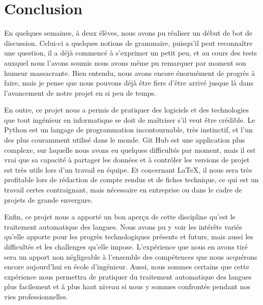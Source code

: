 \documentclass[paper=a4, fontsize=12pt]{article}
\begin{document}
\section{Conclusion}
En quelques semaines, à deux élèves, nous avons pu réaliser un début de bot de discussion. Celui-ci a quelques notions de grammaire, puisqu'il peut reconnaître une question, il a déjà commencé à s'exprimer un petit peu, et au cours des tests auxquel nous l'avons soumis nous avons même pu remarquer par moment son humeur massacrante. Bien entendu, nous avons encore énormément de progrès à faire, mais je pense que nous pouvons déjà être fiers d'être arrivé jusque là dans l'avancement de notre projet en si peu de temps. 

En outre, ce projet nous a permis de pratiquer des logiciels et des technologies que tout ingénieur en informatique se doit de maîtriser s'il veut être crédible. Le Python est un langage de programmation incontournable, très instinctif, et l'un des plus couramment utilisé dans le monde. Git Hub est une application plus complexe, sur laquelle nous avons eu quelques difficultés par moment, mais il est vrai que sa capacité à partager les données et à contrôler les versions de projet est très utile lors d'un travail en équipe. Et concernant LaTeX, il nous sera très profitable lors de rédaction de compte rendus et de fiches technique, ce qui est un travail certes contraignant, mais nécessaire en entreprise ou dans le cadre de projets de grande envergure.

Enfin, ce projet nous a apporté un bon aperçu de cette discipline qu'est le traitement automatique des langues. Nous avons pu y voir les intérêts variés qu'elle apporte pour les progrès technologiques présents et futurs, mais aussi les difficultés et les challenges qu'elle impose. L'expérience que nous en avons tiré sera un apport non négligeable à l'ensemble des compétences que nous acquérons encore aujourd'hui en école d'ingénieur. Aussi, nous sommes certains que cette expérience nous permettra de pratiquer du traitement automatique des langues plus facilement et à plus haut niveau si nous y sommes confrontés pendant nos vies professionnelles.
\end{document}
